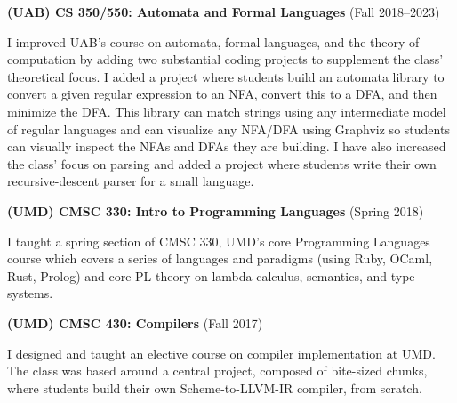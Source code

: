 \documentclass[line]{res}
\begin{document}
\begin{resume}
\textbf{(UAB) CS 350/550: Automata and Formal Languages} (Fall 2018--2023)

I improved UAB's course on automata, formal languages, and the theory of computation by adding two substantial coding projects to supplement the class' theoretical focus. I added a project where students build an automata library to convert a given regular expression to an NFA, convert this to a DFA, and then minimize the DFA. This library can match strings using any intermediate model of regular languages and can visualize any NFA/DFA using Graphviz so students can visually inspect the NFAs and DFAs they are building. I have also increased the class' focus on parsing and added a project where students write their own recursive-descent parser for a small language.

\textbf{(UMD) CMSC 330: Intro to Programming Languages} (Spring 2018)

I taught a spring section of CMSC 330, UMD's core Programming Languages course which covers a series of languages and paradigms (using Ruby, OCaml, Rust, Prolog) and core PL theory on lambda calculus, semantics, and type systems. 

\textbf{(UMD) CMSC 430: Compilers} (Fall 2017)

I designed and taught an elective course on compiler implementation at UMD. The class was based around a central project, composed of bite-sized chunks, where students build their own Scheme-to-LLVM-IR compiler, from scratch. 



\end{resume}
\end{document}
